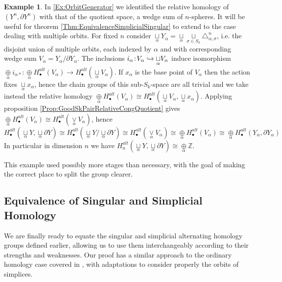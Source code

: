 \documentclass[11pt,a4paper,twoside]{article}
\theoremstyle{plain}
\theoremstyle{definition}
\theoremstyle{definition}
\theoremstyle{definition}
\theoremstyle{definition}
\newtheorem{example}[thm]{Example}
\theoremstyle{definition}
\begin{document}
\begin{example}
\label{Ex:WedgeSumOfOrbits} 
In \ref{Ex:OrbitGenerator} we identified the relative homology of $(Y^n,\partial Y^n)$ with that of the quotient space, a wedge sum of $n$-spheres. It will be useful for theorem \ref{Thm:EquivalenceSimplicialSingular} to extend to the case dealing with multiple orbits.
For fixed $n$ consider $\underset{\alpha}\sqcup Y_\alpha=\underset{\alpha}\sqcup\underset{\sigma\in S_k}\sqcup\triangle^n_{\alpha,\sigma}$, i.e. the disjoint union of multiple orbits, each indexed by $\alpha$ and with corresponding wedge sum $V_\alpha=Y_\alpha/\partial Y_\alpha$. 
The inclusions $i_\alpha\!:\!V_\alpha\xhookrightarrow{}\underset{\alpha}\sqcup V_\alpha$ induce isomorphism $\underset{\alpha}\oplus i_{\alpha *}\!:\!\underset{\alpha}\oplus H_\bullet^{alt}(V_\alpha)\rightarrow H_\bullet^{alt}(\underset{\alpha}\sqcup V_\alpha)$. If $x_\alpha$ is the base point of $V_\alpha$ then the action fixes $\underset{\alpha}\sqcup x_\alpha$, hence the chain groups of this sub-$S_k$-space are all trivial and we take instead the relative homology $\underset{\alpha}\oplus H_\bullet^{alt}(V_\alpha)\cong H_\bullet^{alt}(\underset{\alpha}\sqcup V_\alpha,\underset{\alpha}\sqcup x_\alpha)$. Applying proposition \ref{Prop:GoodSkPairRelativeCongQuotient} gives $\underset{\alpha}\oplus H_\bullet^{alt}(V_\alpha)\cong H_\bullet^{alt}(\underset{\alpha}\vee V_\alpha)$, hence
$$H_\bullet^{alt}(\underset{\alpha}\sqcup Y,\underset{\alpha}\sqcup\partial Y)\cong H_\bullet^{alt}(\underset{\alpha}\sqcup Y/\underset{\alpha}\sqcup\partial Y)\cong H_\bullet^{alt}(\underset{\alpha}\vee V_\alpha) \cong \underset{\alpha}\oplus H_\bullet^{alt}(V_\alpha)\cong \underset{\alpha}\oplus H_\bullet^{alt}(Y_\alpha,\partial Y_\alpha)$$
In particular in dimension $n$ we have $H_n^{alt}(\underset{\alpha}\sqcup Y,\underset{\alpha}\sqcup\partial Y)\cong\underset{\alpha}\oplus \mathbb{Z}$.

This example used possibly more stages than necessary, with the goal of making the correct place to split the group clearer.
\end{example}




\subsection[Simplicial and Singular Equivalence]{Equivalence of Singular and Simplicial Homology}
We are finally ready to equate the singular and simplicial alternating homology groups defined earlier, allowing us to use them interchangeably according to their strengths and weaknesses. Our proof has a similar approach to the ordinary homology case covered in \cite{algebraictopology}, with adaptations to consider properly the orbits of simplices.
\end{document}
